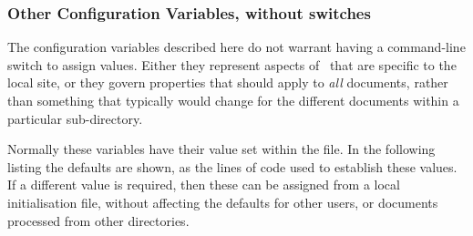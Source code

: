 \subsubsection{Other Configuration Variables, without switches}
%
The configuration variables described here do not warrant having
a command-line switch to assign values.
Either they represent aspects of \latextohtml\ that are specific to the local site,
or they govern properties that should apply to \emph{all} documents,
rather than something that typically would change
for the different documents within a particular sub-directory.

Normally these variables have their value set within the  file.
In the following listing the defaults are shown, as the lines of \Perl{} code
used to establish these values.
If a different value is required, then these can be assigned from
a local  initialisation file,
without affecting the defaults for other users,
or documents processed from other directories.

